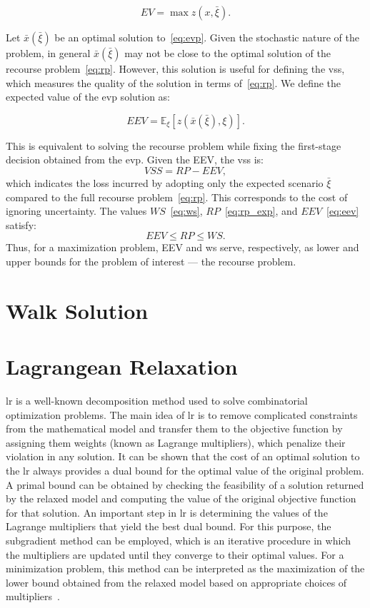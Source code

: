 \begin{equation}
	EV = \max z(x, \bar{\xi}).
	\label{eq:evp}
\end{equation}

Let $\bar{x}(\bar{\xi})$ be an optimal solution to~\eqref{eq:evp}. Given the
stochastic nature of the problem, in general $\bar{x}(\bar{\xi})$ may not be
close to the optimal solution of the recourse problem~\eqref{eq:rp}. However,
this solution is useful for defining the \gls{vss}, which measures the quality
of the solution in terms of~\eqref{eq:rp}. We define the expected value of the
\gls{evp} solution as:

\begin{equation}
	EEV = \mathbb{E}_{\xi} \left[ z(\bar{x}(\bar{\xi}), \xi) \right].
	\label{eq:eev}
\end{equation}

This is equivalent to solving the recourse problem while fixing the first-stage
decision obtained from the \gls{evp}. Given the EEV, the \gls{vss} is:
\[
	VSS = RP - EEV,
\]
which indicates the loss incurred by adopting only the expected scenario
$\bar{\xi}$ compared to the full recourse problem~\eqref{eq:rp}. This
corresponds to the cost of ignoring uncertainty. The values $WS$~\eqref{eq:ws},
$RP$~\eqref{eq:rp_exp}, and $EEV$~\eqref{eq:eev} satisfy:
\[
	EEV \leq RP \leq WS.
\]
Thus, for a maximization problem, EEV  and \gls{ws} serve, respectively,
as lower and upper bounds for the problem of interest — the recourse problem.


\section{Walk Solution}\label{sec:cbrp-walk-solution}

\section{Lagrangean Relaxation}\label{sec:cbrp-lagrangean-relaxation}

\gls{lr} is a well-known decomposition method used to solve combinatorial
optimization problems. The main idea of \gls{lr} is to remove complicated
constraints from the mathematical model and transfer them to the objective
function by assigning them weights (known as Lagrange multipliers), which
penalize their violation in any solution. It can be shown that the cost of an
optimal solution to the \gls{lr} always provides a dual bound for the optimal
value of the original problem. A primal bound can be obtained by checking the
feasibility of a solution returned by the relaxed model and computing the value
of the original objective function for that solution. An important step in
\gls{lr} is determining the values of the Lagrange multipliers that yield the
best dual bound. For this purpose, the subgradient method can be employed, which
is an iterative procedure in which the multipliers are updated until they
converge to their optimal values. For a minimization problem, this method can be
interpreted as the maximization of the lower bound obtained from the relaxed
model based on appropriate choices of multipliers~\cite{Beasley:1993}.

